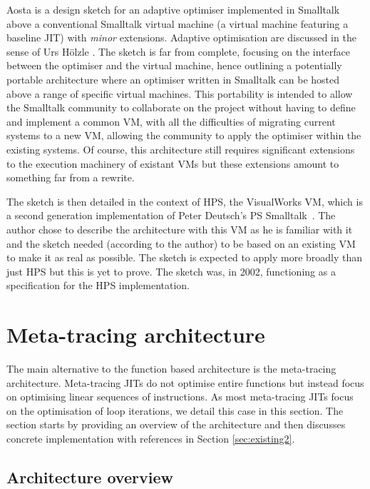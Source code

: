 \documentclass[a4paper,12pt,twoside]{../includes/ThesisStyle}
\begin{document}
Aosta is a design sketch for an adaptive optimiser implemented in Smalltalk above a conventional Smalltalk virtual machine (a virtual machine featuring a baseline JIT) with \emph{minor} extensions. Adaptive optimisation are discussed in the sense of Urs H\"olzle \cite{UrsPHD}. The sketch is far from complete, focusing on the interface between the optimiser and the virtual machine, hence outlining a potentially portable architecture where an optimiser written in Smalltalk can be hosted above a range of specific virtual machines. This portability is intended to allow the Smalltalk community to collaborate on the project without having to define and implement a common VM, with all the difficulties of migrating current systems to a new VM, allowing the community to apply the optimiser within the existing systems.  Of course, this architecture still requires significant extensions to the execution machinery of existant VMs but these extensions amount to something far from a rewrite.

The sketch is then detailed in the context of HPS, the VisualWorks VM, which is a second generation implementation of Peter Deutsch's PS Smalltalk~\cite{Deut84a}. The author chose to describe the architecture with this VM as he is familiar with it and the sketch needed (according to the author) to be based on an existing VM to make it as real as possible. The sketch is expected to apply more broadly than just HPS but this is yet to prove. The sketch was, in 2002, functioning as a specification for the HPS implementation. 


\section{Meta-tracing architecture}
\label{sec:metaArchitecture}

The main alternative to the function based architecture is the meta-tracing architecture. Meta-tracing JITs do not optimise entire functions but instead focus on optimising linear sequences of instructions. As most meta-tracing JITs focus on the optimisation of loop iterations, we detail this case in this section. The section starts by providing an overview of the architecture and then discusses concrete implementation with references in Section \ref{sec:existing2}.

\subsection{Architecture overview}
\end{document}
